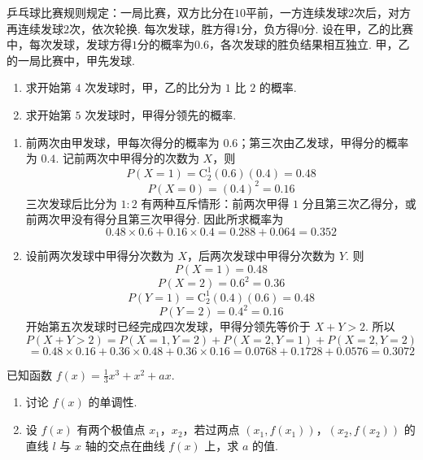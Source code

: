 \begin{problem}
乒乓球比赛规则规定：一局比赛，双方比分在\(10\)平前，一方连续发球\(2\)次后，对方再连续发球\(2\)次，依次轮换. 每次发球，胜方得\(1\)分，负方得\(0\)分. 设在甲，乙的比赛中，每次发球，发球方得\(1\)分的概率为\(0.6\)，各次发球的胜负结果相互独立. 甲，乙的一局比赛中，甲先发球.
\begin{enumerate}
\item 求开始第 \(4\) 次发球时，甲，乙的比分为 \(1\) 比 \(2\) 的概率.
\item 求开始第 \(5\) 次发球时，甲得分领先的概率.
\end{enumerate}
\end{problem}

\begin{solution}
\begin{enumerate}
\item 前两次由甲发球，甲每次得分的概率为 \(0.6\)；第三次由乙发球，甲得分的概率为 \(0.4\). 记前两次中甲得分的次数为 \(X\)，则
\[
P(X=1)=\mathrm C_2^1(0.6)(0.4)=0.48
\]
\[
P(X=0)=(0.4)^2=0.16
\]
三次发球后比分为 \(1:2\) 有两种互斥情形：前两次甲得 \(1\) 分且第三次乙得分，或前两次甲没有得分且第三次甲得分. 因此所求概率为
\[
0.48\times0.6+0.16\times0.4=0.288+0.064=0.352
\]
\item 设前两次发球中甲得分次数为 \(X\)，后两次发球中甲得分次数为 \(Y\). 则
\[
P(X=1)=0.48
\]
\[
P(X=2)=0.6^2=0.36
\]
\[
P(Y=1)=\mathrm C_2^1(0.4)(0.6)=0.48
\]
\[
P(Y=2)=0.4^2=0.16
\]
开始第五次发球时已经完成四次发球，甲得分领先等价于 \(X+Y>2\). 所以
\[
P(X+Y>2)
=P(X=1,Y=2)+P(X=2,Y=1)+P(X=2,Y=2)
\]
\[
=0.48\times0.16+0.36\times0.48+0.36\times0.16
=0.0768+0.1728+0.0576=0.3072
\]
\end{enumerate}
\end{solution}

\begin{problem}
已知函数 \( f(x) = \frac{1}{3} x^3 + x^2 + ax \).
\begin{enumerate}
\item 讨论 \( f(x) \) 的单调性.
\item 设 \( f(x) \) 有两个极值点 \(x_{1}\)，\(x_{2}\)，若过两点 \((x_{1}, f(x_{1}))\)，\((x_{2}, f(x_{2}))\) 的直线 \( l \) 与 \( x \) 轴的交点在曲线 \( f(x) \) 上，求 \( a \) 的值.
\end{enumerate}
\end{problem}

